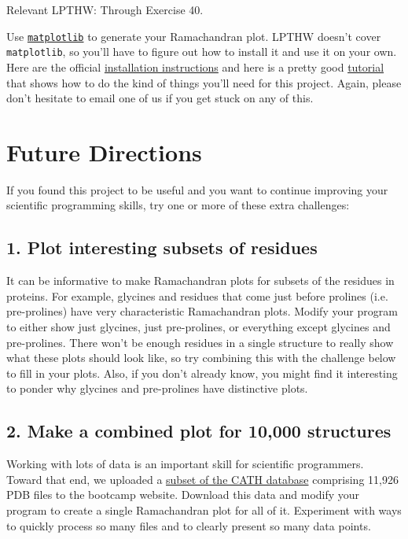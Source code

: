 \documentclass{article}
\newcommand{\module}[2]{\href{#2}{\texttt{#1}}}
\newenvironment{lpthw}
{Relevant LPTHW:}
{}
\begin{document}
\begin{lpthw}
Through Exercise 40.
\end{lpthw}

Use \module{matplotlib}{http://matplotlib.org/users/pyplot_tutorial.html} to 
generate your Ramachandran plot.  LPTHW doesn't cover \texttt{matplotlib}, so 
you'll have to figure out how to install it and use it on your own.  Here are 
the official \href{http://matplotlib.org/users/installing.html} {installation 
instructions} and here is a pretty good
\href{http://matplotlib.org/users/pyplot_tutorial.html}{tutorial} that shows 
how to do the kind of things you'll need for this project.  Again, please don't 
hesitate to email one of us if you get stuck on any of this.

\section{Future Directions}

If you found this project to be useful and you want to continue improving your 
scientific programming skills, try one or more of these extra challenges:

\subsection{1. Plot interesting subsets of residues}

It can be informative to make Ramachandran plots for subsets of the residues in 
proteins.  For example, glycines and residues that come just before prolines 
(i.e. pre-prolines) have very characteristic Ramachandran plots.  Modify your 
program to either show just glycines, just pre-prolines, or everything except 
glycines and pre-prolines.  There won't be enough residues in a single 
structure to really show what these plots should look like, so try combining 
this with the challenge below to fill in your plots.  Also, if you don't 
already know, you might find it interesting to ponder why glycines and 
pre-prolines have distinctive plots.

\subsection{2. Make a combined plot for 10,000 structures}

Working with lots of data is an important skill for scientific programmers.  
Toward that end, we uploaded a 
\href{ftp://ftp.biochem.ucl.ac.uk/pub/cath/v3_5_0/CathDomainPdb.S35.v3.5.0.tgz}{subset 
of the CATH database} comprising 11,926 PDB files to the bootcamp website.  
Download this data and modify your program to create a single Ramachandran plot 
for all of it.  Experiment with ways to quickly process so many files and to 
clearly present so many data points.
\end{document}
